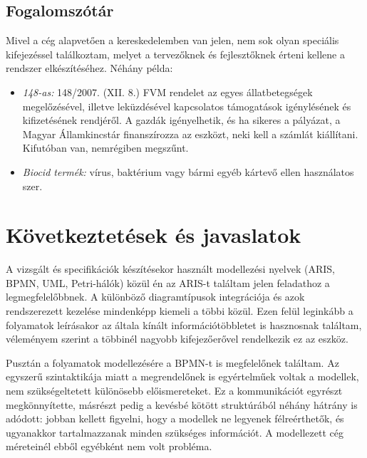 \documentclass[12pt]{article}
\begin{document}
\subsection{ Fogalomszótár}
Mivel a cég alapvetően a kereskedelemben van jelen, nem sok olyan speciális kifejezéssel találkoztam, melyet a tervezőknek és fejlesztőknek érteni kellene a rendszer elkészítéséhez. Néhány példa:
\begin{itemize}

\item \textit{148-as:}  148/2007. (XII. 8.) FVM rendelet az egyes állatbetegségek megelőzésével, illetve leküzdésével kapcsolatos támogatások igénylésének és kifizetésének rendjéről. A gazdák igényelhetik, és ha sikeres a pályázat, a Magyar Államkincstár finanszírozza az eszközt, neki kell a számlát kiállítani. Kifutóban van, nemrégiben megszűnt. 
\item \textit{Biocid termék:} vírus, baktérium vagy bármi egyéb kártevő ellen használatos szer.
\end{itemize}

\newpage
\section{Következtetések és javaslatok}


A vizsgált és specifikációk készítésekor használt modellezési nyelvek (ARIS, BPMN, UML, Petri-hálók) közül én az ARIS-t találtam jelen feladathoz a legmegfelelőbbnek. A különböző diagramtípusok integrációja és azok rendszerezett kezelése mindenképp kiemeli a többi közül. Ezen felül leginkább a folyamatok leírásakor az általa kínált információtöbbletet is hasznosnak találtam, véleményem szerint a többinél nagyobb kifejezőerővel rendelkezik ez az eszköz. 

Pusztán a folyamatok modellezésére a BPMN-t is megfelelőnek találtam. Az egyszerű szintaktikája miatt a megrendelőnek is egyértelműek voltak a modellek, nem szükségeltetett különösebb előismereteket. Ez a kommunikációt egyrészt megkönnyítette, másrészt pedig a kevésbé kötött struktúrából néhány hátrány is adódott: jobban kellett figyelni, hogy a modellek ne legyenek félreérthetők, és ugyanakkor tartalmazzanak minden szükséges információt. A modellezett cég méreteinél ebből egyébként nem volt probléma.
\end{document}
